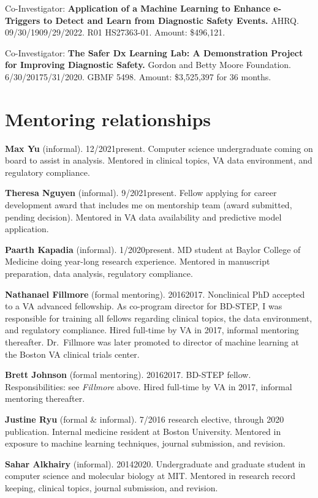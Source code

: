 \documentclass[10pt]{article}
\begin{document}
Co-Investigator: \textbf{Application of a Machine Learning to Enhance
  e-Triggers to Detect and Learn from Diagnostic Safety Events.} AHRQ.
09/30/19\ndash{}09/29/2022. R01 HS27363-01. Amount: \$496,121.

Co-Investigator: \textbf{The Safer Dx Learning Lab: A Demonstration
  Project for Improving Diagnostic Safety.} Gordon and Betty Moore
Foundation. 6/30/2017\ndash{}5/31/2020. GBMF 5498. Amount: \$3,525,397
for 36 months.




\section*{Mentoring relationships} %

\textbf{Max Yu} (informal). 12/2021\ndash{}present. Computer science
undergraduate coming on board to assist in analysis. Mentored in
clinical topics, VA data environment, and regulatory compliance.

\textbf{Theresa Nguyen} (informal). 9/2021\ndash{}present. Fellow
applying for career development award that includes me on mentorship
team (award submitted, pending decision). Mentored in VA data
availability and predictive model application.

\textbf{Paarth Kapadia} (informal). 1/2020\ndash{}present. MD student
at Baylor College of Medicine doing year-long research experience.
Mentored in manuscript preparation, data analysis, regulatory
compliance.

\textbf{Nathanael Fillmore} (formal mentoring). 2016\ndash{}2017.
Nonclinical PhD accepted to a VA advanced fellowship. As co-program
director for BD-STEP, I was responsible for training all fellows
regarding clinical topics, the data environment, and regulatory
compliance. Hired full-time by VA in 2017, informal mentoring
thereafter. Dr.\ Fillmore was later promoted to director of machine
learning at the Boston VA clinical trials center.

\textbf{Brett Johnson} (formal mentoring). 2016\ndash{}2017. BD-STEP
fellow. Responsibilities: see \emph{Fillmore} above. Hired full-time
by VA in 2017, informal mentoring thereafter.

\textbf{Justine Ryu} (formal \& informal). 7/2016 research elective,
through 2020 publication. Internal medicine resident at Boston
University. Mentored in exposure to machine learning techniques,
journal submission, and revision.

\textbf{Sahar Alkhairy} (informal). 2014\ndash{}2020. Undergraduate
and graduate student in computer science and molecular biology at MIT.
Mentored in research record keeping, clinical topics, journal
submission, and revision.
\end{document}
